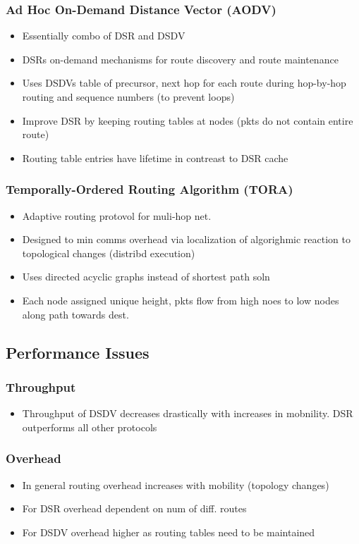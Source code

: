 \documentclass[a4paper]{article}
\begin{document}
\subsubsection{Ad Hoc On-Demand Distance Vector (AODV)}
\begin{itemize}
	\item Essentially combo of DSR and DSDV
	\item DSRs on-demand mechanisms for route discovery and route
		maintenance
	\item Uses DSDVs table of precursor, next hop for each route during
		hop-by-hop routing and sequence numbers (to prevent loops)
	\item Improve DSR by keeping routing tables at nodes (pkts do not
		contain entire route)
	\item Routing table entries have lifetime in contreast to DSR cache
\end{itemize}
\subsubsection{Temporally-Ordered Routing Algorithm (TORA)}
\begin{itemize}
	\item Adaptive routing protovol for muli-hop net.
	\item Designed to min comms overhead via localization of algorighmic
		reaction to topological changes (distribd execution)
	\item Uses directed acyclic graphs instead of shortest path soln
	\item Each node assigned unique height, pkts flow from high noes to low
		nodes along path towards dest.
\end{itemize}
\subsection{Performance Issues}
\subsubsection{Throughput}
\begin{itemize}
	\item Throughput of DSDV decreases drastically with increases in
		mobnility. DSR outperforms all other protocols
\end{itemize}
\subsubsection{Overhead}
\begin{itemize}
	\item In general routing overhead increases with mobility (topology
		changes)
	\item For DSR overhead dependent on num of diff. routes
	\item For DSDV overhead higher as routing tables need to be maintained
\end{itemize}
\end{document}
